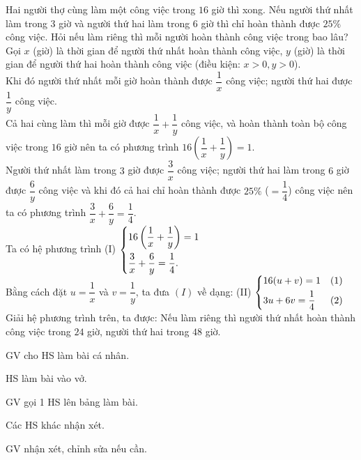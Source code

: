 \begin{baitap}[1.18]
	Hai người thợ cùng làm một công việc trong $16$ giờ thì xong. Nếu người thứ nhất làm trong $3$ giờ và người thứ hai làm trong $6$ giờ thì chỉ hoàn thành được $25\%$ công việc. Hỏi nếu làm riêng thì mỗi người hoàn thành công việc trong bao lâu?
	\doicot
	Gọi $x$ (giờ) là thời gian để người thứ nhất hoàn thành công việc, $y$ (giờ) là thời gian để người thứ hai hoàn thành công việc (điều kiện: $x > 0, y > 0$).\\
	Khi đó người thứ nhất mỗi giờ hoàn thành được $\dfrac{1}{x}$ công việc; người thứ hai được $\dfrac{1}{y}$ công việc.\\
	Cả hai cùng làm thì mỗi giờ được $\dfrac{1}{x} + \dfrac{1}{y}$ công việc, và hoàn thành toàn bộ công việc trong $16$ giờ nên ta có phương trình $16 \left( \dfrac{1}{x} + \dfrac{1}{y} \right) = 1$.\\
	Người thứ nhất làm trong $3$ giờ được $\dfrac{3}{x}$ công việc; người thứ hai làm trong $6$ giờ được $\dfrac{6}{y}$ công việc và khi đó cả hai chỉ hoàn thành được $25\%$ ($= \dfrac{1}{4}$) công việc nên ta có phương trình $\dfrac{3}{x} + \dfrac{6}{y} = \dfrac{1}{4}$.\\
	Ta có hệ phương trình (I) $\left\{\begin{aligned}&16 \left( \dfrac{1}{x} + \dfrac{1}{y} \right) = 1 \\ &\dfrac{3}{x} + \dfrac{6}{y} = \dfrac{1}{4}.\end{aligned}\right.$\\
	Bằng cách đặt $u = \dfrac{1}{x}$ và $v = \dfrac{1}{y}$, ta đưa $(I)$ về dạng: (II) $\left\{\begin{aligned}&16(u + v) = 1 & (1) \\ &3u + 6v = \dfrac{1}{4} & (2)\end{aligned}\right.$\\
	Giải hệ phương trình trên, ta được: Nếu làm riêng thì người thứ nhất hoàn thành công việc trong $24$ giờ, người thứ hai trong $48$ giờ.
\end{baitap}

\tochucthuchien

\begin{tcth}[baitap={từ 1.15 đến 1.18}]
	\buocmot
	\item GV cho HS làm bài cá nhân.
	\buochai
	\item HS làm bài vào vở.
	\item GV gọi 1 HS lên bảng làm bài.
	\buocba
	\item Các HS khác nhận xét. 
	\buocbon
	\item GV nhận xét, chỉnh sửa nếu cần.
\end{tcth}








